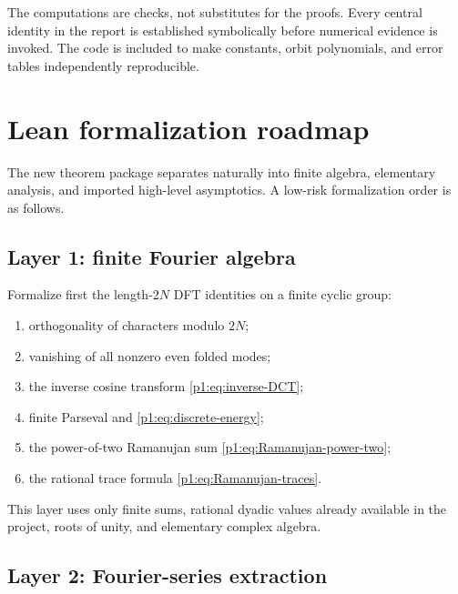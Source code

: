 \documentclass[11pt,oneside]{article}
\theoremstyle{definition}
\theoremstyle{remark}
\begin{document}
\begin{remark}
The computations are checks, not substitutes for the proofs.  Every central
identity in the report is established symbolically before numerical evidence is
invoked.  The code is included to make constants, orbit polynomials, and error
tables independently reproducible.
\end{remark}

\section{Lean formalization roadmap}\label{p1:sec:lean}

The new theorem package separates naturally into finite algebra, elementary
analysis, and imported high-level asymptotics.  A low-risk formalization order is
as follows.

\subsection{Layer 1: finite Fourier algebra}

Formalize first the length-$2N$ DFT identities on a finite cyclic group:
\begin{enumerate}
 \item orthogonality of characters modulo $2N$;
 \item vanishing of all nonzero even folded modes;
 \item the inverse cosine transform \eqref{p1:eq:inverse-DCT};
 \item finite Parseval and \eqref{p1:eq:discrete-energy};
 \item the power-of-two Ramanujan sum \eqref{p1:eq:Ramanujan-power-two};
 \item the rational trace formula \eqref{p1:eq:Ramanujan-traces}.
\end{enumerate}
This layer uses only finite sums, rational dyadic values already available in
the project, roots of unity, and elementary complex algebra.

\subsection{Layer 2: Fourier-series extraction}
\end{document}
